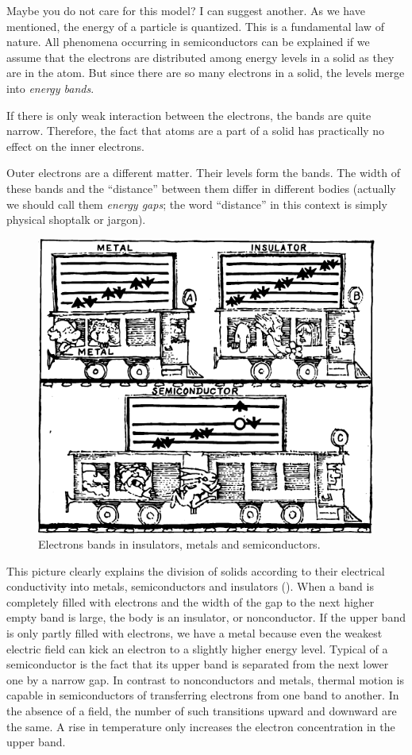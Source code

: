 Maybe you do not care for this model? I can suggest another. As we have mentioned, the energy of a particle is quantized. This is a fundamental law of nature. All phenomena occurring in semiconductors can be explained if we assume that the electrons are distributed among energy levels in a solid as they are in the atom. But since there are so many electrons in a solid, the levels merge into \emph{energy bands}.

If there is only weak interaction between the electrons, the bands are quite narrow. Therefore, the fact that atoms are a part of a solid has practically no effect on the inner electrons.

Outer electrons are a different matter. Their levels form the bands. The width of these bands and the ``distance'' between them differ in different bodies (actually we should call them \emph{energy gaps}; the word ``distance'' in this context is simply physical shoptalk or jargon).

\begin{figure}[!ht]
\centering
\includegraphics[width=\textwidth]{figures/fig-02-09.pdf}
\caption{Electrons bands in insulators, metals and semiconductors.}
\label{fig-2.9}
\end{figure}


This picture clearly explains the division of solids according to their electrical conductivity into metals, semiconductors and insulators (). When a band is completely filled with electrons and the width of the gap to the next higher empty band is large, the body is an insulator, or nonconductor. If the upper band is only partly filled with electrons, we have a metal because even the weakest electric field can kick an electron to a slightly higher energy level. Typical of a semiconductor is the fact that its upper band is separated from the next lower one by a narrow gap. In contrast to nonconductors and metals, thermal motion is capable in semiconductors of transferring electrons from one band to another. In the absence of a field, the number of such transitions upward and downward are the same. A rise in temperature only increases the electron concentration in the upper band.

